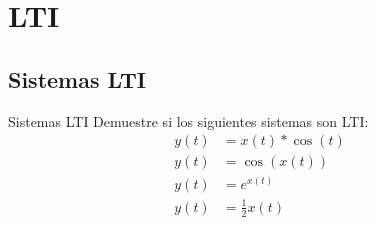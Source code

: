 \subtitle{Trabajo Practico N\textsuperscript{o} 1}
\begin{frame}[c]
\maketitle
{}
\end{frame}
 \section{LTI}
 \subsection{Sistemas LTI}
 \begin{frame}{Sistemas LTI}
 Demuestre si los siguientes sistemas son LTI:\\
 \begin{align*}
    y(t) &= x(t)*\cos{(t)} \\
    y(t) &= \cos(x(t)) \\
    y(t) &= e^{x(t)} \\
    y(t) &= \frac{1}{2}x(t)
 \end{align*}
    \vfill
 \end{frame}
